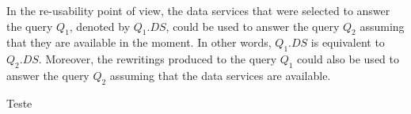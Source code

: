 In the re-usability point of view, the data services that were selected to answer the query $Q_{1}$, denoted by $Q_{1}.DS$, could be used to answer the query $Q_{2}$ assuming that they are available in the moment. In other words, $Q_{1}.DS$ is equivalent to $Q_{2}.DS$. Moreover, the rewritings produced to the query $Q_{1}$ could also be used to answer the query $Q_{2}$ assuming that the data services are available.

\begin{definition}
Teste
\end{definition}